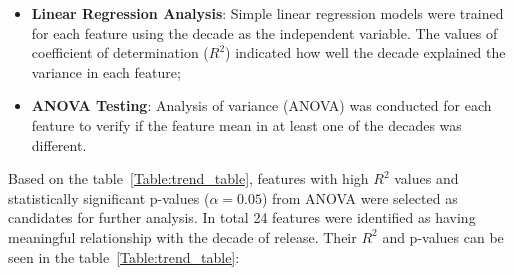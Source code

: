 \begin{itemize}
  \item \textbf{Linear Regression Analysis}: Simple linear regression models
    were trained for each feature using the decade as the independent variable.
    The values of coefficient of determination ($R^2$) indicated how well the
    decade explained the variance in each feature;
  \item \textbf{ANOVA Testing}: Analysis of variance (ANOVA) was conducted for
    each feature to verify if the feature mean in at least one of the decades
    was different.
\end{itemize}

Based on the table~\ref{Table:trend_table}, features with high $R^2$
values and statistically significant p-values ($\alpha = 0.05$) from ANOVA were
selected as candidates for further analysis. In total 24 features were
identified as having meaningful relationship with the decade of release. Their
$R^2$ and p-values can be seen in the table~\ref{Table:trend_table}:


